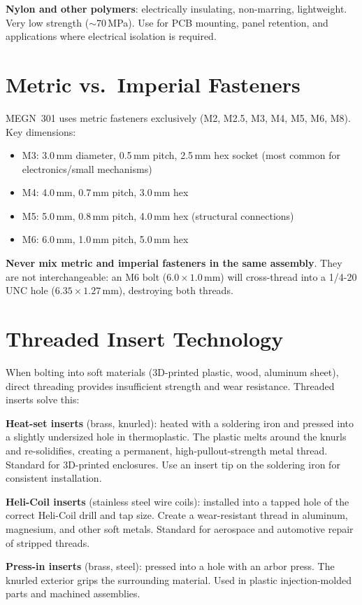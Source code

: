 \textbf{Nylon and other polymers}: electrically insulating, non-marring, lightweight. Very low strength ($\sim$70\,MPa). Use for PCB mounting, panel retention, and applications where electrical isolation is required.

\section{Metric vs.\ Imperial Fasteners}
MEGN~301 uses metric fasteners exclusively (M2, M2.5, M3, M4, M5, M6, M8). Key dimensions:

\begin{itemize}[nosep,leftmargin=1.5em]
\item M3: 3.0\,mm diameter, 0.5\,mm pitch, 2.5\,mm hex socket (most common for electronics/small mechanisms)
\item M4: 4.0\,mm, 0.7\,mm pitch, 3.0\,mm hex
\item M5: 5.0\,mm, 0.8\,mm pitch, 4.0\,mm hex (structural connections)
\item M6: 6.0\,mm, 1.0\,mm pitch, 5.0\,mm hex
\end{itemize}

\textbf{Never mix metric and imperial fasteners in the same assembly}. They are not interchangeable: an M6 bolt ($6.0\times 1.0$\,mm) will cross-thread into a 1/4-20 UNC hole ($6.35\times 1.27$\,mm), destroying both threads.

\section{Threaded Insert Technology}
When bolting into soft materials (3D-printed plastic, wood, aluminum sheet), direct threading provides insufficient strength and wear resistance. Threaded inserts solve this:

\textbf{Heat-set inserts} (brass, knurled): heated with a soldering iron and pressed into a slightly undersized hole in thermoplastic. The plastic melts around the knurls and re-solidifies, creating a permanent, high-pullout-strength metal thread. Standard for 3D-printed enclosures. Use an insert tip on the soldering iron for consistent installation.

\textbf{Heli-Coil inserts} (stainless steel wire coils): installed into a tapped hole of the correct Heli-Coil drill and tap size. Create a wear-resistant thread in aluminum, magnesium, and other soft metals. Standard for aerospace and automotive repair of stripped threads.

\textbf{Press-in inserts} (brass, steel): pressed into a hole with an arbor press. The knurled exterior grips the surrounding material. Used in plastic injection-molded parts and machined assemblies.

